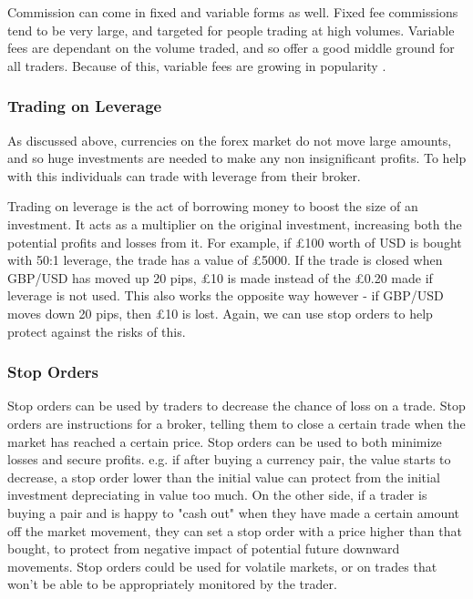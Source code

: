             Commission can come in fixed and variable forms as well. Fixed fee commissions tend to be very large, and targeted for people trading at high volumes. Variable fees are dependant on the volume traded, and so offer a good middle ground for all traders. Because of this, variable fees are growing in popularity \cite{llc_2016}. 



            \subsubsection{Trading on Leverage}
            As discussed above, currencies on the forex market do not move large amounts, and so huge investments are needed to make any non insignificant profits. To help with this individuals can trade with leverage from their broker. 
                        
            Trading on leverage is the act of borrowing money to boost the size of an investment. It acts as a multiplier on the original investment, increasing both the potential profits and losses from it. For example, if £100 worth of USD is bought with 50:1 leverage, the trade has a value of £5000. If the trade is closed when GBP/USD has moved up 20 pips, £10 is made instead of the £0.20 made if leverage is not used. \cite{lioudis_2018}This also works the opposite way however - if GBP/USD moves down 20 pips, then £10 is lost. Again, we can use stop orders to help protect against the risks of this. 



            \subsubsection{Stop Orders}
            Stop orders can be used by traders to decrease the chance of loss on a trade. Stop orders are instructions for a broker, telling them to close a certain trade when the market has reached a certain price. Stop orders can be used to both minimize losses and secure profits. e.g. if after buying a currency pair, the value starts to decrease, a stop order lower than the initial value can protect from the initial investment depreciating in value too much. On the other side, if a trader is buying a pair and is happy to "cash out" when they have made a certain amount off the market movement, they can set a stop order with a price higher than that bought, to protect from negative impact of potential future downward movements. Stop orders could be used for volatile markets, or on trades that won't be able to be appropriately monitored by the trader. \cite{momoh_2018}
            


